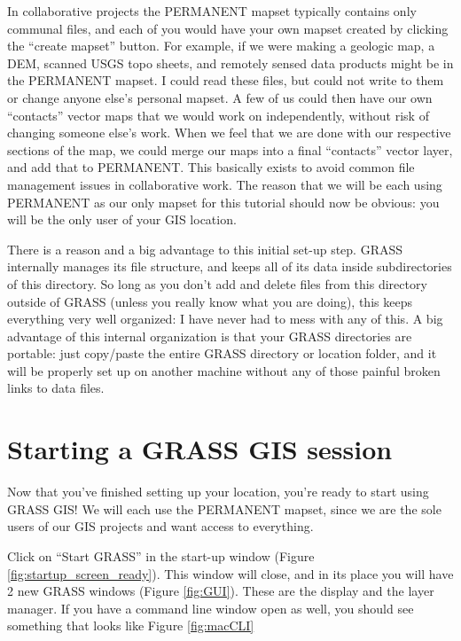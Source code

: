 \documentclass{book}
\begin{document}
In collaborative projects the PERMANENT mapset typically contains only communal files, and each of you would have your own mapset created by clicking the ``create mapset'' button. For example, if we were making a geologic map, a DEM, scanned USGS topo sheets, and remotely sensed data products might be in the PERMANENT mapset. I could read these files, but could not write to them or change anyone else's personal mapset. A few of us could then have our own ``contacts'' vector maps that we would work on independently, without risk of changing someone else's work. When we feel that we are done with our respective sections of the map, we could merge our maps into a final ``contacts'' vector layer, and add that to PERMANENT. This basically exists to avoid common file management issues in collaborative work. The reason that we will be each using PERMANENT as our only mapset for this tutorial should now be obvious: you will be the only user of your GIS location.

There is a reason and a big advantage to this initial set-up step. GRASS internally manages its file structure, and keeps all of its data inside subdirectories of this directory. So long as you don't add and delete files from this directory outside of GRASS (unless you really know what you are doing), this keeps everything very well organized: I have never had to mess with any of this. A big advantage of this internal organization is that your GRASS directories are portable: just copy/paste the entire GRASS directory or location folder, and it will be properly set up on another machine without any of those painful broken links to data files.

\section{Starting a GRASS GIS session}

Now that you've finished setting up your location, you're ready to start using GRASS GIS! We will each use the PERMANENT mapset, since we are the sole users of our GIS projects and want access to everything.

Click on ``Start GRASS'' in the start-up window (Figure \ref{fig:startup_screen_ready}). This window will close, and in its place you will have 2 new GRASS windows (Figure \ref{fig:GUI}). These are the display and the layer manager. If you have a command line window open as well, you should see something that looks like Figure \ref{fig:macCLI}
\end{document}
